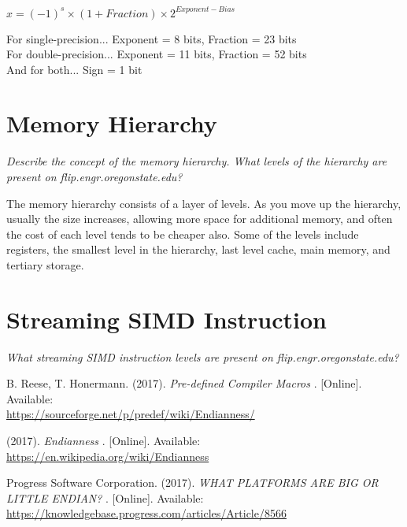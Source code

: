 \documentclass[letterpaper,10pt,onecolumn]{IEEEtran}
\begin{document}
\noindent
$ x = (-1)^s \times (1 + Fraction) \times 2^{ Exponent - Bias} $

\noindent
For single-precision... Exponent = 8 bits, Fraction = 23 bits \\
For double-precision... Exponent = 11 bits, Fraction = 52 bits \\
And for both... Sign = 1 bit

\section{\textbf{Memory Hierarchy}}

\iffalse
\noindent
\fi

\noindent
\textit{Describe the concept of the memory hierarchy. What levels of the hierarchy are present on flip.engr.oregonstate.edu?}

\noindent
The memory hierarchy consists of a layer of levels. As you move up the hierarchy, usually the size increases, allowing more space for additional memory, and often the cost of each level tends to be cheaper also. Some of the levels include registers, the smallest level in the hierarchy, last level cache, main memory, and tertiary storage.

\section{\textbf{Streaming SIMD Instruction}}

\iffalse
\noindent
\fi

\noindent
\textit{What streaming SIMD instruction levels are present on flip.engr.oregonstate.edu?}

\noindent


\newpage

\begin{thebibliography}{3}

B. Reese, T. Honermann. (2017). 
\textit{Pre-defined Compiler Macros} 
. [Online]. Available: 
\\\url{https://sourceforge.net/p/predef/wiki/Endianness/}

(2017). 
\textit{Endianness} 
. [Online]. Available: 
\\\url{https://en.wikipedia.org/wiki/Endianness}

Progress Software Corporation. (2017). 
\textit{WHAT PLATFORMS ARE BIG OR LITTLE ENDIAN?} 
. [Online]. Available: 
\\\url{https://knowledgebase.progress.com/articles/Article/8566}

\iffalse
\bibitem{first}
F. Author. (year). 
\textit{title} 
. [Online]. Available: 
\\\url{url}
\fi

\end{thebibliography}
\end{document}
